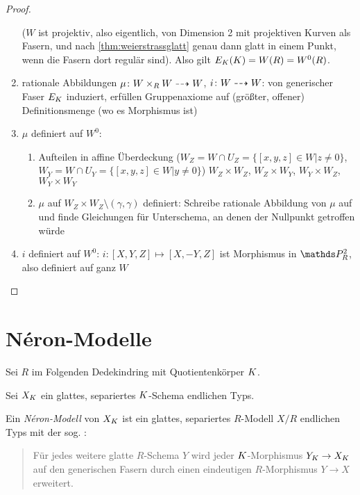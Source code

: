 \documentclass[german]{scrreprt}
\begin{document}
\begin{Lemma}
\begin{proof}
\begin{enumerate}
      ($W$ ist projektiv, also eigentlich, von Dimension 2 mit
      projektiven Kurven als Fasern, und nach
      \autoref{thm:weierstrassglatt} genau dann glatt in einem Punkt,
      wenn die Fasern dort regulär sind).
      Also gilt $E_{K}(K)=W(R)=W^0(R)$.
    \item rationale Abbildungen
      $\mu\colon W\times_R W\dashrightarrow W$,
      $i\colon W\dashrightarrow W$:
      von generischer Faser $E_{K}$ induziert, erfüllen Gruppenaxiome
      auf (größter, offener) Definitionsmenge (wo es Morphismus ist)
    \item $\mu$ definiert auf $W^0$:
      \begin{enumerate}
      \item Aufteilen in affine Überdeckung
        ($W_Z=W\cap U_Z=\{[x,y,z]\in W| z\neq0\}$,
        $W_Y=W\cap U_Y=\{[x,y,z]\in W| y\neq0\}$)
        $W_Z\times W_Z$, $W_Z\times W_Y$, $W_Y\times W_Z$,
        $W_Y\times W_Y$
      \item $\mu$ auf $W_Z\times W_Z\setminus(\gamma,\gamma)$
        definiert:
        Schreibe rationale Abbildung von $\mu$ auf und finde
        Gleichungen für Unterschema, an denen der Nullpunkt getroffen
        würde
      \end{enumerate}
    \item $i$ definiert auf $W^0$:
      $i\colon [X,Y,Z]\mapsto [X,-Y,Z]$ ist Morphismus in $\P_R^2$,
      also definiert auf ganz $W$
    \end{enumerate}
  \end{proof}
\end{Lemma}



\chapter{Néron-Modelle}
Sei $R$ im Folgenden Dedekindring mit Quotientenkörper $K$.

\begin{Definition}
  Sei $X_{K}$ ein glattes, separiertes $K$-Schema endlichen Typs.

  Ein \emph{Néron-Modell} von $X_{K}$ ist ein glattes, separiertes
  $R$-Modell $X/R$ endlichen Typs mit der
  sog. \NAbbEig:
  \begin{quote}
    Für jedes weitere glatte $R$-Schema $Y$ wird jeder
    $K$-Morphismus $Y_{K}\to X_{K}$ auf den generischen Fasern durch
    einen eindeutigen $R$-Morphismus $Y\to X$ erweitert.
  \end{quote}
  \cite[1.2, Definition 1]{neron}
\end{Definition}
\end{document}
